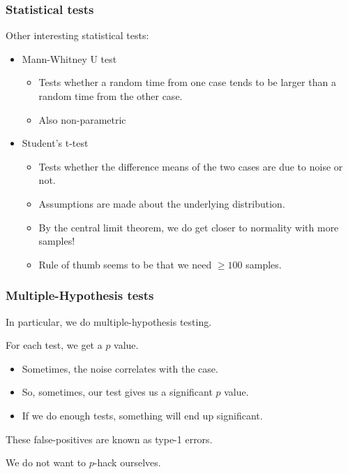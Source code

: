 \documentclass[10pt,aspectratio=169]{beamer}
\begin{document}
\begin{frame}
  \frametitle{Statistical tests}

  Other interesting statistical tests:
  \bigskip
  \begin{itemize}
  \item Mann-Whitney U test
    \begin{itemize}
    \item Tests whether a random time from one case tends to be larger
      than a random time from the other case.
    \item Also non-parametric
    \end{itemize}
          \pause
  \item Student's t-test
    \begin{itemize}
    \item Tests whether the difference means of the two cases are due
      to noise or not.
    \item Assumptions are made about the underlying distribution.
    \item By the central limit theorem, we do get closer to normality
      with more samples!
    \item Rule of thumb seems to be that we need $\geq{}100$ samples.
    \end{itemize}
  \end{itemize}

 
\end{frame}


\begin{frame}
  \frametitle{Multiple-Hypothesis tests}

  In particular, we do multiple-hypothesis testing.

  \bigskip

  For each test, we get a $p$ value.
  \begin{itemize}
  \item Sometimes, the noise correlates with the case.
  \item So, sometimes, our test gives us a significant $p$ value.
  \item If we do enough tests, something will end up significant.
  \end{itemize}

  \bigskip

  These false-positives are known as type-1 errors.

  \bigskip

  We do not want to $p$-hack ourselves.

\end{frame}
  
\end{document}

